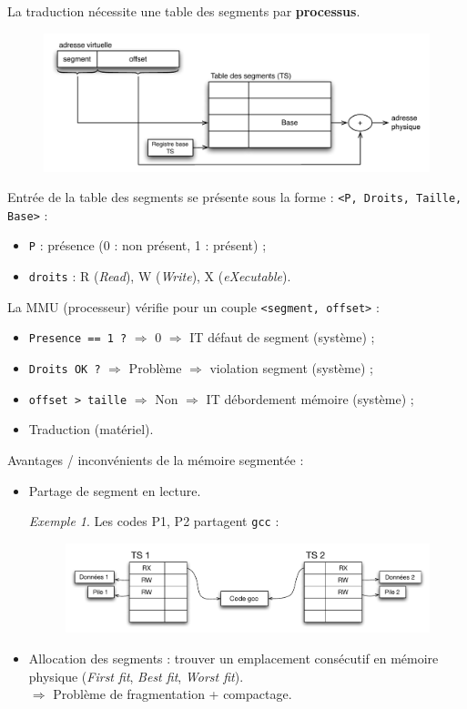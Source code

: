 \documentclass[11pt,english,french]{scrreprt}
\theoremstyle{remark}
\newtheorem*{ex*}{Exemple}
\theoremstyle{definition}
\newcommand*\Pitem{%
  \item[\color{green}\scalebox{0.9}{\textbullet}]}
\newcommand*\Citem{%
  \item[\color{red}\scalebox{0.9}{\textbullet}]}
\begin{document}
La traduction nécessite une table des segments par \textbf{processus}.

\begin{figure}[h!]
	\center
	\vspace{-10pt}
	\includegraphics[scale=.85]{img/ts}
\end{figure}

Entrée de la table des segments se présente sous la forme : \lstinline!<P, Droits, Taille, Base>! :
\begin{itemize}
	\item \lstinline!P! : présence (0 : non présent, 1 : présent) ;
	\item \lstinline!droits! : R (\emph{Read}), W (\emph{Write}), X (\emph{eXecutable}).
\end{itemize}

\vspace{5pt}
La MMU (processeur) vérifie pour un couple \lstinline!<segment, offset>! :
\begin{itemize}
	\item \lstinline!Presence == 1 ?!  $\Rightarrow$ 0  $\Rightarrow$ IT défaut de segment (système) ;
	\item \lstinline!Droits OK ?!  $\Rightarrow$ Problème  $\Rightarrow$ violation segment (système) ;
	\item \lstinline!offset > taille!  $\Rightarrow$ Non $\Rightarrow$ IT débordement mémoire (système) ;
	\item Traduction (matériel).
\end{itemize}

Avantages / inconvénients de la mémoire segmentée : \begin{itemize}
	\Pitem Partage de segment en lecture.
	\begin{ex*}
	Les codes P1, P2 partagent \lstinline!gcc! :
	\begin{figure}[h!]
		\center
		\vspace{-10pt}
		\includegraphics[scale=.6]{img/partage-gcc}
	\end{figure}
	\end{ex*}
	\Citem Allocation des segments : trouver un emplacement consécutif en mémoire physique (\emph{First fit}, \emph{Best fit}, \emph{Worst fit}).\\
 $\Rightarrow$ Problème de fragmentation + compactage.
\end{itemize}
\end{document}
